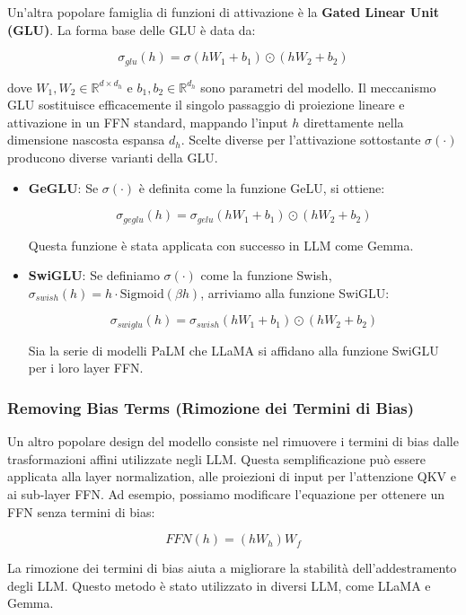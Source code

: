 Un'altra popolare famiglia di funzioni di attivazione è la \textbf{Gated Linear Unit (GLU)}. La forma base delle GLU è data da:


$$\sigma_{glu}(h) = \sigma(hW_1 + b_1) \odot (hW_2 + b_2)$$


dove $W_1, W_2 \in \mathbb{R}^{d \times d_h}$ e $b_1, b_2 \in \mathbb{R}^{d_h}$ sono parametri del modello. Il meccanismo GLU sostituisce efficacemente il singolo passaggio di proiezione lineare e attivazione in un FFN standard, mappando l'input $h$ direttamente nella dimensione nascosta espansa $d_h$. Scelte diverse per l'attivazione sottostante $\sigma(\cdot)$ producono diverse varianti della GLU.
\begin{itemize}
\item \textbf{GeGLU}: Se $\sigma(\cdot)$ è definita come la funzione GeLU, si ottiene:


$$\sigma_{geglu}(h) = \sigma_{gelu}(hW_1 + b_1) \odot (hW_2 + b_2)$$


Questa funzione è stata applicata con successo in LLM come Gemma.
\item \textbf{SwiGLU}: Se definiamo $\sigma(\cdot)$ come la funzione Swish, $\sigma_{swish}(h) = h \cdot \text{Sigmoid}(\beta h)$, arriviamo alla funzione SwiGLU:


$$\sigma_{swiglu}(h) = \sigma_{swish}(hW_1 + b_1) \odot (hW_2 + b_2)$$


Sia la serie di modelli PaLM che LLaMA si affidano alla funzione SwiGLU per i loro layer FFN.
\end{itemize}

\subsubsection{Removing Bias Terms (Rimozione dei Termini di Bias)}
Un altro popolare design del modello consiste nel rimuovere i termini di bias dalle trasformazioni affini utilizzate negli LLM. Questa semplificazione può essere applicata alla layer normalization, alle proiezioni di input per l'attenzione QKV e ai sub-layer FFN. Ad esempio, possiamo modificare l'equazione per ottenere un FFN senza termini di bias:


$$FFN(h) = (hW_h)W_f$$


La rimozione dei termini di bias aiuta a migliorare la stabilità dell'addestramento degli LLM. Questo metodo è stato utilizzato in diversi LLM, come LLaMA e Gemma.

